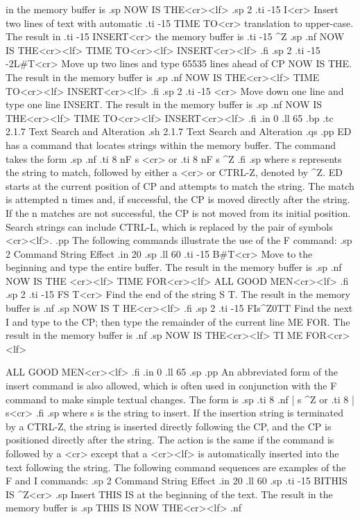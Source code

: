 in the memory buffer is
.sp
NOW IS THE<cr><lf>
.sp 2
.ti -15
I<cr>          Insert two  lines of text with  automatic
.ti -15
TIME TO<cr>    translation to upper-case.  The result in
.ti -15
INSERT<cr>     the memory buffer is
.ti -15
^Z
.sp
.nf
NOW IS THE<cr><lf>
TIME TO<cr><lf>
INSERT<cr><lf>
.fi
.sp 2
.ti -15
-2L#T<cr>      Move up two lines and type 65535 lines ahead of CP NOW IS THE.
The result in the memory buffer is
.sp
.nf
NOW IS THE<cr><lf>
TIME TO<cr><lf>
INSERT<cr><lf>
.fi
.sp 2
.ti -15
<cr>           Move down one line and type one line INSERT.  The result in
the memory buffer is
.sp
.nf
NOW IS THE<cr><lf>
TIME TO<cr><lf>
INSERT<cr><lf>
.fi
.in 0
.ll 65
.bp
.tc         2.1.7  Text Search and Alteration
.sh
2.1.7  Text Search and Alteration
.qs
.pp
ED has a command that locates strings within the memory
buffer.  The command takes the form
.sp
.nf
.ti 8
nF s <cr>
or
.ti 8
nF s ^Z
.fi
.sp
where s represents the string to match, followed by either a <cr>
or CTRL-Z, denoted by ^Z.  ED starts at the current position
of CP and attempts to match the string.  The match is attempted n
times and, if successful, the CP is moved directly after the
string.  If the n matches are not successful, the CP is not moved
from its initial position.  Search strings can include CTRL-L,
which is replaced by the pair of symbols <cr><lf>.
.pp
The following commands illustrate the use of the F command:
.sp 2
  Command String                      Effect
.in 20
.sp
.ll 60
.ti -15
B#T<cr>        Move to the beginning and type the entire buffer.  The result
in the memory buffer is
.sp
.nf
NOW IS THE <cr><lf>
TIME FOR<cr><lf>
ALL GOOD MEN<cr><lf>
.fi
.sp 2
.ti -15
FS T<cr>       Find the end of the string S T.  The result in the memory
buffer is
.nf
.sp
NOW IS T  HE<cr><lf>
.fi
.sp 2
.ti -15
FIs^Z0TT       Find the next I and type to the CP; then type the remainder
of the current line ME FOR.  The result in the memory buffer is
.nf
.sp
NOW IS THE<cr><lf>
TI  ME FOR<cr><lf>

ALL GOOD MEN<cr><lf>
.fi
.in 0
.ll 65
.sp
.pp
An abbreviated form of the insert command is also allowed, which
is often used in conjunction with the F command to make simple
textual changes.  The form is
.sp
.ti 8
.nf
| s ^Z
or
.ti 8
| s<cr>
.fi
.sp
where s is the string to insert.  If the insertion string is
terminated by a CTRL-Z, the string is inserted directly following
the CP, and the CP is positioned directly after the string.  The
action is the same if the command is followed by a <cr> except
that a <cr><lf> is automatically inserted into the text following
the string.  The following command sequences are examples
of the F and I commands:
.sp 2
  Command String                      Effect
.in 20
.ll 60
.sp
.ti -15
BITHIS IS ^Z<cr>
.sp
Insert THIS IS at the beginning of the text.  The result in the
memory buffer is
.sp
THIS IS  NOW THE<cr><lf>
.nf

